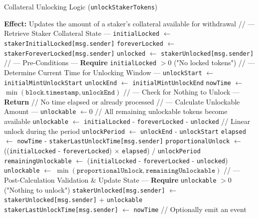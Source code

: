 \documentclass{DESSThesis}
\begin{document}
\begin{algorithm}[htbp]
\caption{Collateral Unlocking Logic (\texttt{unlockStakerTokens})}
\label{alg:unlock_staker_tokens}
\begin{algorithmic}[1]
        \State \textbf{Effect:} Updates the amount of a staker's collateral available for withdrawal
        \State
        \State // --- Retrieve Staker Collateral State ---
        \State \texttt{initialLocked} $\gets$ \texttt{stakerInitialLocked[msg.sender]}
        \State \texttt{foreverLocked} $\gets$ \texttt{stakerForeverLocked[msg.sender]}
        \State \texttt{unlocked} $\gets$ \texttt{stakerUnlocked[msg.sender]}
        \State
        \State // --- Pre-Conditions ---
        \State \textbf{Require} \texttt{initialLocked} $> 0$ ("No locked tokens")
        \State
        \State // --- Determine Current Time for Unlocking Window ---
        \State \texttt{unlockStart} $\gets$ \texttt{initialMintUnlockStart}
        \State \texttt{unlockEnd} $\gets$ \texttt{initialMintUnlockEnd}
        \State \texttt{nowTime} $\gets$ $\min(\texttt{block.timestamp}, \texttt{unlockEnd})$
        \State
        \State // --- Check for Nothing to Unlock ---
            \State \textbf{Return} // No time elapsed or already processed
        \EndIf
        \State
        \State // --- Calculate Unlockable Amount ---
        \State \texttt{unlockable} $\gets 0$
            \State // All remaining unlockable tokens become available
            \State \texttt{unlockable} $\gets$ \texttt{initialLocked} - \texttt{foreverLocked} - \texttt{unlocked}
        \Else
            \State // Linear unlock during the period
            \State \texttt{unlockPeriod} $\gets$ \texttt{unlockEnd} - \texttt{unlockStart}
            \State \texttt{elapsed} $\gets$ \texttt{nowTime} - \texttt{stakerLastUnlockTime[msg.sender]}
            \State \texttt{proportionalUnlock} $\gets$ ((\texttt{initialLocked} - \texttt{foreverLocked}) $\times$ \texttt{elapsed}) / \texttt{unlockPeriod}
            \State \texttt{remainingUnlockable} $\gets$ (\texttt{initialLocked} - \texttt{foreverLocked} - \texttt{unlocked})
            \State \texttt{unlockable} $\gets$ $\min(\texttt{proportionalUnlock}, \texttt{remainingUnlockable})$
        \EndIf
        \State
        \State // --- Post-Calculation Validation \& Update State ---
        \State \textbf{Require} \texttt{unlockable} $> 0$ ("Nothing to unlock")
        \State \texttt{stakerUnlocked[msg.sender]} $\gets$ \texttt{stakerUnlocked[msg.sender]} + \texttt{unlockable}
        \State \texttt{stakerLastUnlockTime[msg.sender]} $\gets$ \texttt{nowTime}
        \State // Optionally emit an event
    \EndProcedure
\end{algorithmic}
\end{algorithm}
\end{document}
